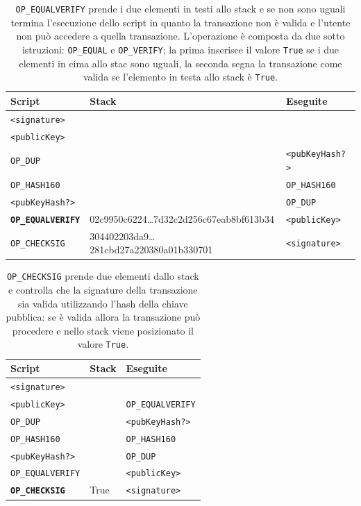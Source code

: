 \begin{table}[H]
    \centering
    \begin{tabular}{p{3cm}|p{7.7cm}|p{3cm}}
        Script & Stack & Eseguite\\
        \hline
        \texttt{<signature>}              & &\\
        \texttt{<publicKey>}              & &\\
        \texttt{OP\_DUP}                  &                                            & \texttt{<pubKeyHash?>}\\
        \texttt{OP\_HASH160}              &                                            & \texttt{OP\_HASH160}\\
        \texttt{<pubKeyHash?>}            &                                            & \texttt{OP\_DUP}\\
        \texttt{\textbf{OP\_EQUALVERIFY}} & 02c9950c6224\dots7d32c2d256c67eab8bf613b34 & \texttt{<publicKey>}\\
        \texttt{OP\_CHECKSIG}             & 304402203da9\dots281cbd27a220380a01b330701 & \texttt{<signature>}\\
    \end{tabular}
    \caption{\texttt{OP\_EQUALVERIFY} prende i due elementi in testi allo stack e se non sono uguali termina l'esecuzione dello script in quanto la transazione non è valida e l'utente non può accedere a quella transazione. L'operazione è composta da due sotto istruzioni: \texttt{OP\_EQUAL} e \texttt{OP\_VERIFY}; la prima inserisce il valore \texttt{True} se i due elementi in cima allo stac sono uguali, la seconda segna la transazione come valida se l'elemento in testa allo stack è \texttt{True}.}
\end{table}

\begin{table}[H]
    \centering
    \begin{tabular}{p{3cm}|p{7.7cm}|p{3cm}}
        Script & Stack & Eseguite\\
        \hline
        \texttt{<signature>}              &      &\\
        \texttt{<publicKey>}              &      & \texttt{OP\_EQUALVERIFY}\\
        \texttt{OP\_DUP}                  &      & \texttt{<pubKeyHash?>}\\
        \texttt{OP\_HASH160}              &      & \texttt{OP\_HASH160}\\
        \texttt{<pubKeyHash?>}            &      & \texttt{OP\_DUP}\\
        \texttt{OP\_EQUALVERIFY}          &      & \texttt{<publicKey>}\\
        \texttt{\textbf{OP\_CHECKSIG}}    & True & \texttt{<signature>}\\
    \end{tabular}
    \caption{\texttt{OP\_CHECKSIG} prende due elementi dallo stack e controlla che la signature della transazione sia valida utilizzando l'hash della chiave pubblica: se è valida allora la transazione può procedere e nello stack viene posizionato il valore \texttt{True}.}
\end{table}

